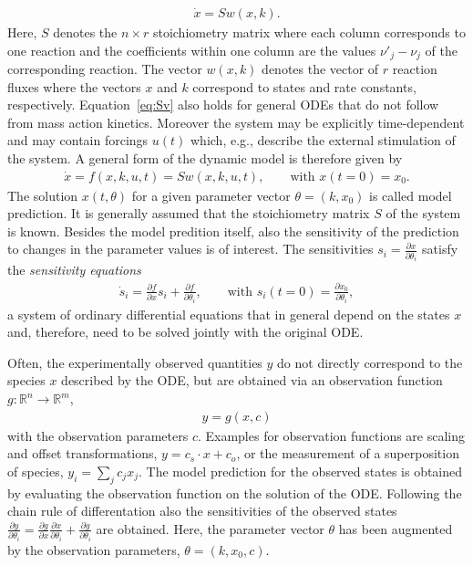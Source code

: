 \documentclass[article]{jss}
\begin{document}
\begin{align}
\dot x = S w(x, k).
\label{eq:Sv}
\end{align}
Here, $S$ denotes the $n\times r$ stoichiometry matrix where each column corresponds to one reaction and the coefficients within one column are the values $\nu'_j - \nu_j$ of the corresponding reaction. The vector $w(x, k)$ denotes the vector of $r$ reaction fluxes where the vectors $x$ and $k$ correspond to states and rate constants, respectively.
Equation~\ref{eq:Sv} also holds for general ODEs that do not follow from mass action kinetics. Moreover the system may be explicitly time-dependent and may contain forcings $u(t)$ which, e.g., describe the external stimulation of the system. A general form of the dynamic model is therefore given by
\begin{align}
\dot x = f(x,k,u,t) = S w(x,k,u,t), \quad\quad \textrm{with }  x(t = 0) = x_0.
\end{align}
The solution $x(t,\theta)$ for a given parameter vector $\theta = (k, x_0)$ is called model prediction. %
It is generally assumed that the stoichiometry matrix $S$ of the system is known.
Besides the model predition itself, also the sensitivity of the prediction to changes in the parameter values is of interest.
The sensitivities $s_i = \frac{\partial x}{\partial \theta_i}$ satisfy the \textit{sensitivity equations}
\begin{align}
\dot s_i  = \frac{\partial f}{\partial x} s_i + \frac{\partial f}{\partial \theta_i}, \qquad \textrm{with }s_i(t = 0) = \frac{\partial x_0}{\partial \theta_i},
\end{align}
a system of ordinary differential equations that in general depend on the states $x$ and, therefore, need to be solved jointly with the original ODE.

Often, the experimentally observed quantities $y$ do not directly correspond to the species $x$ described by the ODE, but are obtained via an observation function $g: \mathbb{R}^n \rightarrow \mathbb{R}^m$,  \begin{align}
	y = g(x, c)
\label{eq:observation}
\end{align}
with the observation parameters $c$. Examples for observation functions are scaling and offset transformations, $y = c_s \cdot x + c_o$, or the measurement of a superposition of species, $y_i = \sum_j c_j x_j$. The model prediction for the observed states is obtained by evaluating the observation function on the solution of the ODE. Following the chain rule of differentation also the sensitivities of the observed states $\frac{\partial y}{\partial \theta_i} = \frac{\partial g}{\partial x} \frac{\partial x}{\partial\theta_i}  + \frac{\partial g}{\partial \theta_i}$ are obtained. Here, the parameter vector $\theta$ has been augmented by the observation parameters, $\theta = (k, x_0, c)$.
\end{document}
